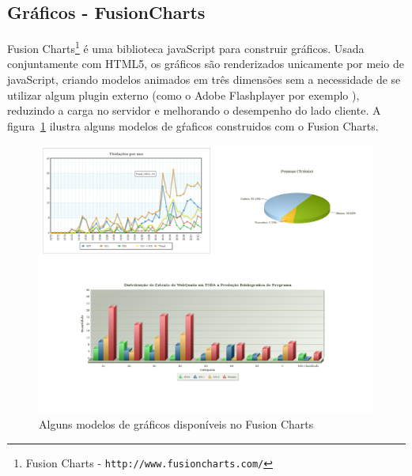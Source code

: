 \subsection{Gráficos - FusionCharts}
\label{sub:fc}

Fusion Charts\footnote{ Fusion Charts - \texttt{http://www.fusioncharts.com/}} é uma biblioteca javaScript para construir gráficos. Usada conjuntamente com HTML5, os gráficos são renderizados unicamente por meio de javaScript, criando modelos animados em três dimensões sem a necessidade de se utilizar algum plugin externo (como o Adobe Flashplayer por exemplo ), reduzindo a carga no servidor e melhorando o desempenho do lado cliente. A figura~\ref{fig:fusion} ilustra alguns modelos de gŕaficos construidos com o Fusion Charts.

\begin{figure}[H]
    \includegraphics[width=\textwidth]{figuras/graf_ex}
    \caption{Alguns modelos de gráficos disponíveis no Fusion Charts}
    \label{fig:fusion}
\end{figure}

